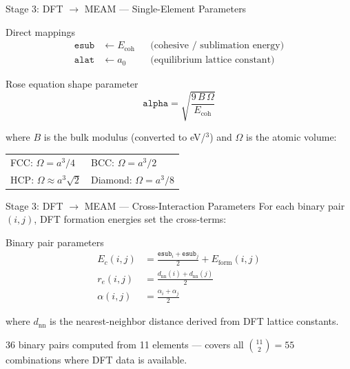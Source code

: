 \begin{frame}{Stage 3: DFT $\to$ MEAM --- Single-Element Parameters}
\begin{block}{Direct mappings}
\vspace{-0.5em}
\begin{align*}
  \texttt{esub}  &\leftarrow E_\mathrm{coh} & &\text{(cohesive / sublimation energy)} \\
  \texttt{alat}  &\leftarrow a_0             & &\text{(equilibrium lattice constant)}
\end{align*}
\vspace{-1.2em}
\end{block}

\begin{block}{Rose equation shape parameter}
\vspace{-0.3em}
\[
  \texttt{alpha} = \sqrt{\frac{9\,B\,\Omega}{E_\mathrm{coh}}}
\]
\vspace{-0.8em}

where $B$ is the bulk modulus (converted to eV/\Ang$^3$) and $\Omega$ is the atomic volume:
\vspace{-0.3em}

\centering\small
\begin{tabular}{ll}
FCC: $\Omega = a^3/4$ \quad & BCC: $\Omega = a^3/2$ \\
HCP: $\Omega \approx a^3\sqrt{2}$ \quad & Diamond: $\Omega = a^3/8$
\end{tabular}
\end{block}
\end{frame}

\begin{frame}{Stage 3: DFT $\to$ MEAM --- Cross-Interaction Parameters}
For each binary pair $(i,j)$, DFT formation energies set the cross-terms:

\vspace{0.5em}
\begin{block}{Binary pair parameters}
\vspace{-0.5em}
\begin{align*}
  E_c(i,j) &= \frac{\texttt{esub}_i + \texttt{esub}_j}{2} + E_\mathrm{form}(i,j) \\[6pt]
  r_e(i,j) &= \frac{d_\mathrm{nn}(i) + d_\mathrm{nn}(j)}{2} \\[6pt]
  \alpha(i,j) &= \frac{\alpha_i + \alpha_j}{2}
\end{align*}
\vspace{-1em}

where $d_\mathrm{nn}$ is the nearest-neighbor distance derived from DFT lattice constants.
\end{block}

\vspace{0.3em}
\small 36 binary pairs computed from 11 elements --- covers all $\binom{11}{2} = 55$ combinations where DFT data is available.
\end{frame}


